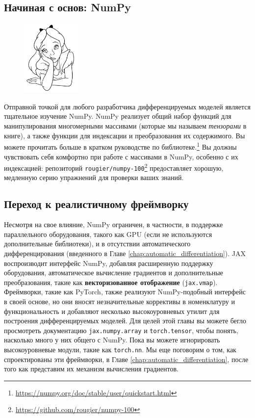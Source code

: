 \subsection*{Начиная с основ: NumPy}

\begin{figure}
\vspace{-4em}\includegraphics[width=3.0cm]{images/shutterstock_2075221579.jpg}
\vspace{-2em}
\end{figure} 

Отправной точкой для любого разработчика дифференцируемых моделей является тщательное изучение NumPy. NumPy реализует общий набор функций для манипулирования многомерными массивами (которые мы называем \textit{тензорами} в книге), а также функции для индексации и преобразования их содержимого. Вы можете прочитать больше в кратком руководстве по библиотеке.\footnote{\url{https://numpy.org/doc/stable/user/quickstart.html}} Вы должны чувствовать себя комфортно при работе с массивами в NumPy, особенно с их индексацией: репозиторий {\footnotesize\verb+rougier/numpy-100+}\footnote{\url{https://github.com/rougier/numpy-100}} предоставляет хорошую, медленную серию упражнений для проверки ваших знаний.

\subsection*{Переход к реалистичному фреймворку}

Несмотря на свое влияние, NumPy ограничен, в частности, в поддержке параллельного оборудования, такого как GPU (если не используются дополнительные библиотеки), и в отсутствии автоматического дифференцирования (введенного в Главе \ref{chap:automatic_differentiation}). JAX воспроизводит интерфейс NumPy, добавляя расширенную поддержку оборудования, автоматическое вычисление градиентов и дополнительные преобразования, такие как \textbf{векторизованное отображение} (\texttt{jax.vmap}). Фреймворки, такие как PyTorch, также реализуют NumPy-подобный интерфейс в своей основе, но они вносят незначительные коррективы в номенклатуру и функциональность и добавляют несколько высокоуровневых утилит для построения дифференцируемых моделей. Для целей этой главы вы можете бегло просмотреть документацию \texttt{jax.numpy.array} и \texttt{torch.tensor}, чтобы понять, насколько много у них общего с NumPy. Пока вы можете игнорировать высокоуровневые модули, такие как \texttt{torch.nn}. Мы еще поговорим о том, как спроектированы эти фреймворки, в Главе \ref{chap:automatic_differentiation}, после того как представим их механизм вычисления градиентов.

